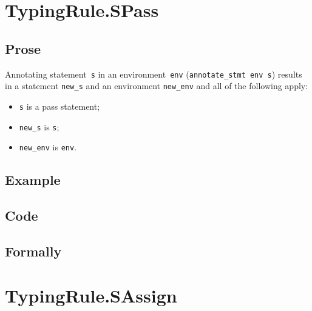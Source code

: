 \documentclass{book}
\begin{document}
\section{TypingRule.SPass \label{sec:TypingRule.SPass}}

    \subsection{Prose}
Annotating statement~\texttt{s} in an environment~\texttt{env}
(\texttt{annotate\_stmt env s}) results in a statement \texttt{new\_s} and an
environment \texttt{new\_env} and all of the following apply:
    \begin{itemize}
    \item \texttt{s} is a pass statement;
    \item \texttt{new\_s} is \texttt{s};
    \item \texttt{new\_env} is \texttt{env}.
    \end{itemize}

    \subsection{Example}

    \subsection{Code}

\begin{emptyformal}
    \subsection{Formally}
\end{emptyformal}


\section{TypingRule.SAssign \label{sec:TypingRule.SAssign}}
\end{document}
